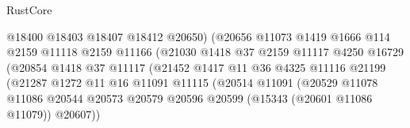 \begin{lexlean}{RustCore}
\begin{coremodule}
                                        @18400
                                        @18403
                                        @18407
                                        @18412
                                        @20650)
                                      (@20656
                                        @11073
                                        @1419
                                        @1666
                                        @114
                                        @2159
                                        @11118
                                        @2159
                                        @11166
                                        (@21030
                                          @1418
                                          @37
                                          @2159
                                          @11117
                                          @4250
                                          @16729
                                          (@20854
                                            @1418
                                            @37
                                            @11117
                                            (@21452
                                              @1417
                                              @11
                                              @36
                                              @4325
                                              @11116
                                              @21199
                                              (@21287
                                                @1272
                                                @11
                                                @16
                                                @11091
                                                @11115
                                                (@20514
                                                  @11091
                                                  (@20529
                                                    @11078
                                                    @11086
                                                    @20544
                                                    @20573
                                                    @20579
                                                    @20596
                                                    @20599
                                                    (@15343 (@20601 @11086 @11079))
                                                    @20607))

\end{coremodule}
\end{lexlean}
